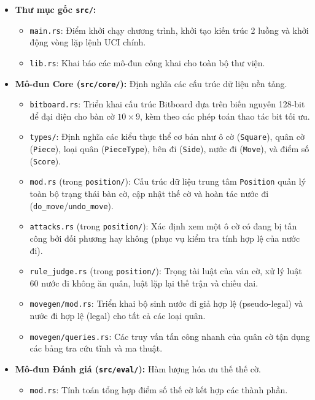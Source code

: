 \begin{itemize}
    \item \textbf{Thư mục gốc \texttt{src/}:}
    \begin{itemize}
        \item \texttt{main.rs}: Điểm khởi chạy chương trình, khởi tạo kiến trúc 2 luồng và khởi động vòng lặp lệnh UCI chính.
        \item \texttt{lib.rs}: Khai báo các mô-đun công khai cho toàn bộ thư viện.
    \end{itemize}
    \item \textbf{Mô-đun Core (\texttt{src/core/}):} Định nghĩa các cấu trúc dữ liệu nền tảng.
    \begin{itemize}
        \item \texttt{bitboard.rs}: Triển khai cấu trúc Bitboard dựa trên biến nguyên 128-bit để đại diện cho bàn cờ $10 \times 9$, kèm theo các phép toán thao tác bit tối ưu.
        \item \texttt{types/}: Định nghĩa các kiểu thực thể cơ bản như ô cờ (\texttt{Square}), quân cờ (\texttt{Piece}), loại quân (\texttt{PieceType}), bên đi (\texttt{Side}), nước đi (\texttt{Move}), và điểm số (\texttt{Score}).
        \item \texttt{mod.rs} (trong \texttt{position/}): Cấu trúc dữ liệu trung tâm \texttt{Position} quản lý toàn bộ trạng thái bàn cờ, cập nhật thế cờ và hoàn tác nước đi (\texttt{do\_move}/\texttt{undo\_move}).
        \item \texttt{attacks.rs} (trong \texttt{position/}): Xác định xem một ô cờ có đang bị tấn công bởi đối phương hay không (phục vụ kiểm tra tính hợp lệ của nước đi).
        \item \texttt{rule\_judge.rs} (trong \texttt{position/}): Trọng tài luật của ván cờ, xử lý luật 60 nước đi không ăn quân, luật lặp lại thế trận và chiếu dai.
        \item \texttt{movegen/mod.rs}: Triển khai bộ sinh nước đi giả hợp lệ (pseudo-legal) và nước đi hợp lệ (legal) cho tất cả các loại quân.
        \item \texttt{movegen/queries.rs}: Các truy vấn tấn công nhanh của quân cờ tận dụng các bảng tra cứu tĩnh và ma thuật.
    \end{itemize}
    \item \textbf{Mô-đun Đánh giá (\texttt{src/eval/}):} Hàm lượng hóa ưu thế thế cờ.
    \begin{itemize}
        \item \texttt{mod.rs}: Tính toán tổng hợp điểm số thế cờ kết hợp các thành phần.

\end{itemize}
\end{itemize}
